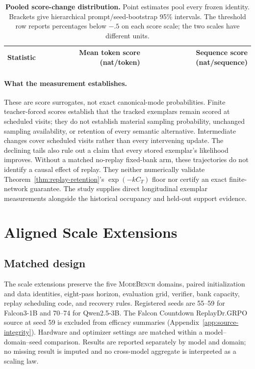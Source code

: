 \documentclass{article}
\newcommand{\1}{\mathbf 1}
\newcommand{\mb}{\textsc{ModeBench}}
\theoremstyle{remark}
\theoremstyle{definition}
\theoremstyle{plain}
\begin{document}
\begin{table}[H]
  \centering
  \caption{\textbf{Pooled score-change distribution.}
  Point estimates pool every frozen identity. Brackets give hierarchical
  prompt/seed-bootstrap 95\% intervals. The threshold row reports percentages
  below $-.5$ on each score scale; the two scales have different units.}
  \label{tab:e121-fixed-bank-bootstrap}
  \small
  \setlength{\tabcolsep}{5pt}
  \begin{tabular}{@{}lrr@{}}
    \toprule
    \textbf{Statistic} & \textbf{Mean token score (nat/token)}
      & \textbf{Sequence score (nat/sequence)} \\
    \midrule
    
  \end{tabular}
\end{table}

\paragraph{What the measurement establishes.}
These are score surrogates, not exact canonical-mode probabilities. Finite
teacher-forced scores establish that the tracked exemplars remain scored at
scheduled visits; they do not establish material sampling probability,
unchanged sampling availability, or retention of every semantic alternative.
Intermediate changes cover scheduled visits rather than every intervening update. The declining tails also rule out a
claim that every stored exemplar's likelihood improves. Without a matched
no-replay fixed-bank arm, these trajectories do not identify a causal effect
of replay. They neither numerically validate
Theorem~\ref{thm:replay-retention}'s $\exp(-kC_T)$ floor nor certify an exact
finite-network guarantee. The study supplies direct longitudinal exemplar
measurements alongside the historical occupancy and held-out support evidence.

\section{Aligned Scale Extensions}
\label{app:aligned-xmode}

\subsection{Matched design}
\label{app:scale-matrix}

The scale extensions preserve the five \mb{} domains, paired initialization
and data identities, eight-pass horizon, evaluation grid, verifier, bank
capacity, replay scheduling code, and recovery rules. Registered seeds are
55--59 for Falcon3-1B and 70--74 for Qwen2.5-3B. The Falcon Countdown
ReplayDr.GRPO source at seed 59 is excluded from efficacy summaries
(Appendix~\ref{app:source-integrity}). Hardware and optimizer settings are matched
within a model--domain--seed comparison. Results are reported separately by
model and domain; no missing result is imputed and no cross-model aggregate
is interpreted as a scaling law.
\end{document}
